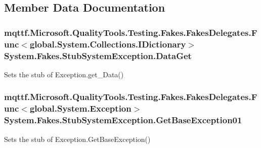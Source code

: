 \subsection{Member Data Documentation}
\hypertarget{class_system_1_1_fakes_1_1_stub_system_exception_ab6e6d9768ac274e6af09fa3491c6f791}{
\subsubsection[{Data\-Get}]{\setlength{\rightskip}{0pt plus 5cm}mqttf.\-Microsoft.\-Quality\-Tools.\-Testing.\-Fakes.\-Fakes\-Delegates.\-Func$<$global.\-System.\-Collections.\-I\-Dictionary$>$ System.\-Fakes.\-Stub\-System\-Exception.\-Data\-Get}}\label{class_system_1_1_fakes_1_1_stub_system_exception_ab6e6d9768ac274e6af09fa3491c6f791}


Sets the stub of Exception.\-get\-\_\-\-Data()

\hypertarget{class_system_1_1_fakes_1_1_stub_system_exception_a2b60d1569cf05193db125d3a7b6a19de}{
\subsubsection[{Get\-Base\-Exception01}]{\setlength{\rightskip}{0pt plus 5cm}mqttf.\-Microsoft.\-Quality\-Tools.\-Testing.\-Fakes.\-Fakes\-Delegates.\-Func$<$global.\-System.\-Exception$>$ System.\-Fakes.\-Stub\-System\-Exception.\-Get\-Base\-Exception01}}\label{class_system_1_1_fakes_1_1_stub_system_exception_a2b60d1569cf05193db125d3a7b6a19de}


Sets the stub of Exception.\-Get\-Base\-Exception()

